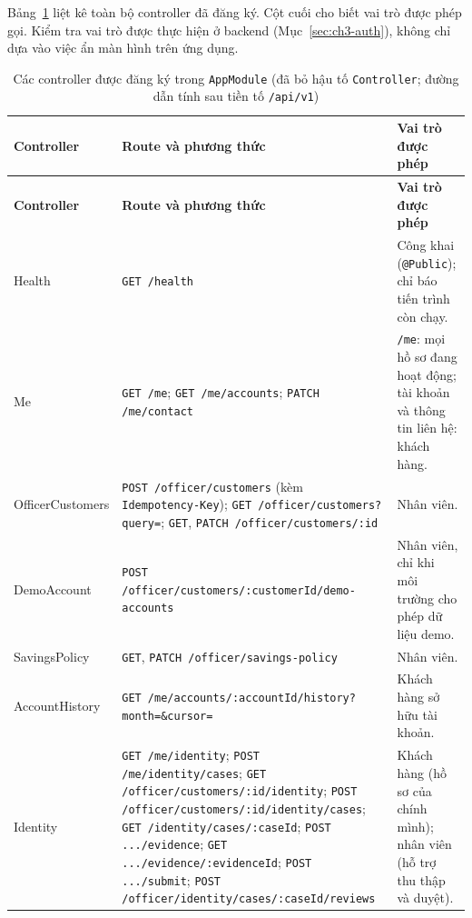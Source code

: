 Bảng~\ref{tab:ch3-controllers} liệt kê toàn bộ controller đã đăng ký. Cột cuối cho biết vai trò được phép gọi. Kiểm tra vai trò được thực hiện ở backend (Mục~\ref{sec:ch3-auth}), không chỉ dựa vào việc ẩn màn hình trên ứng dụng.

\begingroup
\footnotesize
\begin{longtable}{@{}>{\raggedright\arraybackslash}p{3.3cm}>{\raggedright\arraybackslash}p{6.6cm}>{\raggedright\arraybackslash}p{4.5cm}@{}}
	\caption{Các controller được đăng ký trong \texttt{AppModule} (đã bỏ hậu tố \texttt{Controller}; đường dẫn tính sau tiền tố \texttt{/\allowbreak{}api/\allowbreak{}v1})}
	\label{tab:ch3-controllers}\\
	\toprule
	\textbf{Controller} & \textbf{Route và phương thức} & \textbf{Vai trò được phép}\\
	\midrule
	\endfirsthead
	\toprule
	\textbf{Controller} & \textbf{Route và phương thức} & \textbf{Vai trò được phép}\\
	\midrule
	\endhead
	\bottomrule
	\endlastfoot
	Health & \texttt{GET /\allowbreak{}health} & Công khai (\texttt{@Public}); chỉ báo tiến trình còn chạy.\\
	Me & \texttt{GET /\allowbreak{}me}; \texttt{GET /\allowbreak{}me/\allowbreak{}accounts}; \texttt{PATCH /\allowbreak{}me/\allowbreak{}contact} & \texttt{/\allowbreak{}me}: mọi hồ sơ đang hoạt động; tài khoản và thông tin liên hệ: khách hàng.\\
	Officer\-Customers &\texttt{POST /\allowbreak{}officer/\allowbreak{}customers} (kèm \texttt{Idempotency-\allowbreak{}Key}); \texttt{GET /\allowbreak{}officer/\allowbreak{}customers?query=}; \texttt{GET}, \texttt{PATCH /\allowbreak{}officer/\allowbreak{}customers/\allowbreak{}:id} & Nhân viên.\\
	DemoAccount & \texttt{POST /officer/customers/\allowbreak:customerId/\allowbreak demo-accounts} & Nhân viên, chỉ khi môi trường cho phép dữ liệu demo.\\
	SavingsPolicy & \texttt{GET}, \texttt{PATCH /officer/\allowbreak savings-policy} & Nhân viên.\\
	Account\-History &\texttt{GET /me/accounts/\allowbreak:accountId/\allowbreak history?month=\&cursor=} & Khách hàng sở hữu tài khoản.\\
	Identity & \texttt{GET /\allowbreak{}me/\allowbreak{}identity}; \texttt{POST /\allowbreak{}me/\allowbreak{}identity/\allowbreak{}cases}; \texttt{GET /officer/customers/\allowbreak:id/identity}; \texttt{POST /officer/customers/\allowbreak:id/identity/cases}; \texttt{GET /identity/cases/\allowbreak:caseId}; \texttt{POST .../\allowbreak{}evidence}; \texttt{GET .../evidence/\allowbreak:evidenceId}; \texttt{POST .../\allowbreak{}submit}; \texttt{POST /officer/identity/\allowbreak cases/:caseId/reviews} & Khách hàng (hồ sơ của chính mình); nhân viên (hỗ trợ thu thập và duyệt).\\

\end{longtable}
